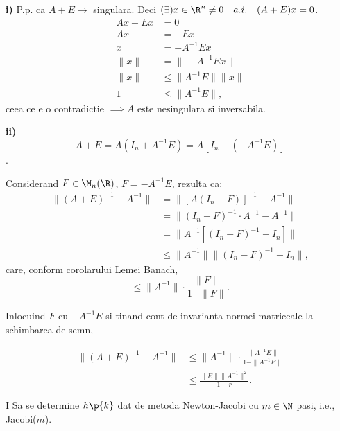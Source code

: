 \begin{demonstratie}

    \textbf{i)} P.p. ca $ A + E \rightarrow $ singulara. Deci $ (\exists) x \in \R^{n} \neq 0 \quad a.i. \quad (A+E)x = 0 $.
    \begin{align*}
        Ax + Ex &= 0 \\
        Ax &= -Ex \\
        x &= -A^{-1}Ex \\
        \|x\| &= \|-A^{-1}Ex\| \\
        \|x\| &\leq \|A^{-1}E\| \|x\| \\ 
        1 &\leq \|A^{-1}E\|, 
    \end{align*}
    ceea ce e o contradictie $ \implies A $ este nesingulara si inversabila.

    \bigskip

    \textbf{ii)}
    $$ A + E = A(I_n + A^{-1}E) = A[I_n - (-A^{-1}E)] $$.

    Considerand $F \in \M_n(\R)$, $F = -A^{-1}E$, rezulta ca:
    \begin{align*}
        \|(A+E)^{-1} - A^{-1}\| &= \| [A(I_n - F)]^{-1} - A^{-1} \| \\
        &= \| (I_n - F)^{-1} \cdot A^{-1} - A^{-1} \| \\
        &= \| A^{-1} [(I_n - F)^{-1} - I_n] \| \\
        &\leq \| A^{-1} \| \| (I_n - F)^{-1} - I_n \|,
    \end{align*}
    care, conform corolarului Lemei Banach,
    $$ \leq \|A^{-1}\| \cdot \frac{\|F\|}{1 - \|F\|}. $$

    Inlocuind $F$ cu $-A^{-1}E$ si tinand cont de invarianta normei matriceale la schimbarea de semn,

    \begin{align*}
        \|(A+E)^{-1} - A^{-1}\| &\leq \|A^{-1}\| \cdot \frac{\|A^{-1}E\|}{1 - \|A^{-1}E\|} \\
        &\leq \frac{\|E\| \|A^{-1}\|^2}{1 - r}.
    \end{align*}

\end{demonstratie}

\begin{exercitiu}{I} 
    Sa se determine $h\p{k}$ dat de metoda Newton-Jacobi cu $ m \in \N $ pasi, i.e., Jacobi($m$).
\end{exercitiu}

